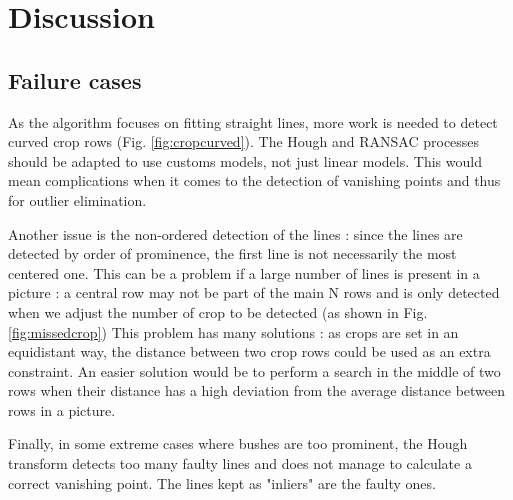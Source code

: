 \chapter{Discussion}

\section{Failure cases}

As the algorithm focuses on fitting straight lines, more work is needed to detect curved crop rows (Fig. \ref{fig:cropcurved}). The Hough and RANSAC processes should be adapted to use customs models, not just linear models. This would mean complications when it comes to the detection of vanishing points and thus for outlier elimination.

Another issue is the non-ordered detection of the lines : since the lines are detected by order of prominence, the first line is not necessarily the most centered one. This can be a problem if a large number of lines is present in a picture : a central row may not be part of the main N rows and is only detected when we adjust the number of crop to be detected (as shown in Fig. \ref{fig:missedcrop})
This problem has many solutions : as crops are set in an equidistant way, the distance between two crop rows could be used as an extra constraint. An easier solution would be to perform a search in the middle of two rows when their distance has a high deviation from the average distance between rows in a picture.

Finally, in some extreme cases where bushes are too prominent, the Hough transform detects too many faulty lines and does not manage to calculate a correct vanishing point. The lines kept as "inliers" are the faulty ones.

